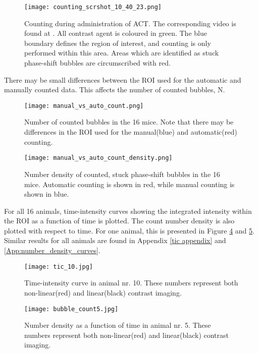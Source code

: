 \begin{figure}[h]
  \centering
  \texttt{[image: counting\_scrshot\_10\_40\_23.png]}
  \cprotect\caption{Counting during administration of ACT\texttrademark{}. The corresponding video is found at . All contrast agent is coloured in green. The blue boundary defines the region of interest, and counting is only performed within this area. Areas which are identified as stuck phase-shift bubbles are circumscribed with red.}
  \label{Fig:counting_administration}
\end{figure}

There may be small differences between the ROI used for the automatic and manually counted data. This affects the number of counted bubbles, N.

\begin{figure}[h]
  \centering
  \texttt{[image: manual\_vs\_auto\_count.png]}
  \caption{Number of counted bubbles in the 16 mice. Note that there may be differences in the ROI used for the manual(blue) and automatic(red) counting.}
  \label{Fig:Number of counted bubbles}
\end{figure}

\begin{figure}[h]
  \centering
  \texttt{[image: manual\_vs\_auto\_count\_density.png]}
  \caption{Number density of counted, stuck phase-shift bubbles in the 16 mice. Automatic counting is shown in red, while manual counting is shown in blue.}
  \label{Fig:Number density of counted bubbles}
\end{figure}

For all 16 animals, time-intensity curves showing the integrated intensity within the ROI as a function of time is plotted. The count number density is also plotted with respect to time. For one animal, this is presented in Figure \ref{Fig:tic} and \ref{Fig:tic_count}. Similar results for all animals are found in Appendix \ref{tic appendix} and \ref{App:number_density_curves}.


\begin{figure}[h]
  \centering
  \texttt{[image: tic\_10.jpg]}
  \caption{Time-intensity curve in animal nr. 10. These numbers represent both non-linear(red) and linear(black) contrast imaging.}
  \label{Fig:tic}
\end{figure}

\begin{figure}[h]
  \centering
  \texttt{[image: bubble\_count5.jpg]}
  \caption{Number density as a function of time in animal nr. 5. These numbers represent both non-linear(red) and linear(black) contrast imaging.}
  \label{Fig:tic_count}
\end{figure}

\clearpage



